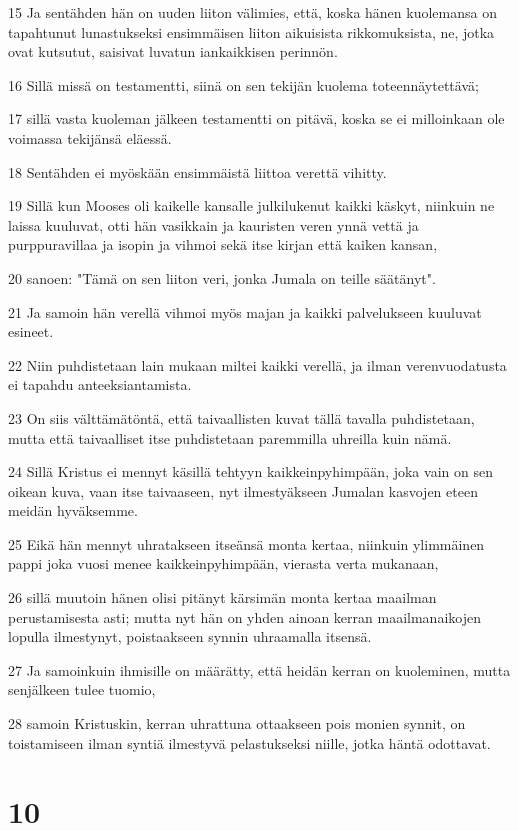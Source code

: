 \par 15 Ja sentähden hän on uuden liiton välimies, että, koska hänen kuolemansa on tapahtunut lunastukseksi ensimmäisen liiton aikuisista rikkomuksista, ne, jotka ovat kutsutut, saisivat luvatun iankaikkisen perinnön.
\par 16 Sillä missä on testamentti, siinä on sen tekijän kuolema toteennäytettävä;
\par 17 sillä vasta kuoleman jälkeen testamentti on pitävä, koska se ei milloinkaan ole voimassa tekijänsä eläessä.
\par 18 Sentähden ei myöskään ensimmäistä liittoa verettä vihitty.
\par 19 Sillä kun Mooses oli kaikelle kansalle julkilukenut kaikki käskyt, niinkuin ne laissa kuuluvat, otti hän vasikkain ja kauristen veren ynnä vettä ja purppuravillaa ja isopin ja vihmoi sekä itse kirjan että kaiken kansan,
\par 20 sanoen: "Tämä on sen liiton veri, jonka Jumala on teille säätänyt".
\par 21 Ja samoin hän verellä vihmoi myös majan ja kaikki palvelukseen kuuluvat esineet.
\par 22 Niin puhdistetaan lain mukaan miltei kaikki verellä, ja ilman verenvuodatusta ei tapahdu anteeksiantamista.
\par 23 On siis välttämätöntä, että taivaallisten kuvat tällä tavalla puhdistetaan, mutta että taivaalliset itse puhdistetaan paremmilla uhreilla kuin nämä.
\par 24 Sillä Kristus ei mennyt käsillä tehtyyn kaikkeinpyhimpään, joka vain on sen oikean kuva, vaan itse taivaaseen, nyt ilmestyäkseen Jumalan kasvojen eteen meidän hyväksemme.
\par 25 Eikä hän mennyt uhratakseen itseänsä monta kertaa, niinkuin ylimmäinen pappi joka vuosi menee kaikkeinpyhimpään, vierasta verta mukanaan,
\par 26 sillä muutoin hänen olisi pitänyt kärsimän monta kertaa maailman perustamisesta asti; mutta nyt hän on yhden ainoan kerran maailmanaikojen lopulla ilmestynyt, poistaakseen synnin uhraamalla itsensä.
\par 27 Ja samoinkuin ihmisille on määrätty, että heidän kerran on kuoleminen, mutta senjälkeen tulee tuomio,
\par 28 samoin Kristuskin, kerran uhrattuna ottaakseen pois monien synnit, on toistamiseen ilman syntiä ilmestyvä pelastukseksi niille, jotka häntä odottavat.

\chapter{10}

